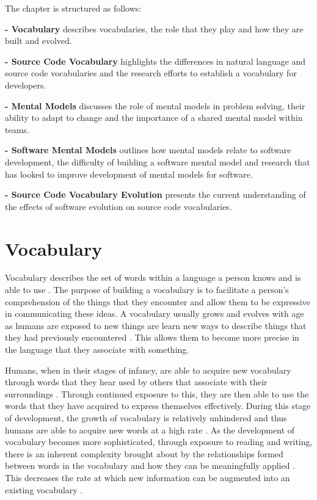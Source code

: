 The chapter is structured as follows:

\textbf{ - Vocabulary} describes vocabularies, the role that they play and how they are built and evolved.

\textbf{ - Source Code Vocabulary} highlights the differences in natural language and source code vocabularies and the research efforts to establish a vocabulary for developers.

\textbf{ - Mental Models} discusses the role of mental models in problem solving, their ability to adapt to change and the importance of a shared mental model within teams.

\textbf{ - Software Mental Models} outlines how mental models relate to software development, the difficulty of building a software mental model and research that has looked to improve development of mental models for software.

\textbf{ - Source Code Vocabulary Evolution} presents the current understanding of the effects of software evolution on source code vocabularies.

\section{Vocabulary} %
\label{sec:vocabulary}

Vocabulary describes the set of words within a language a person knows and is able to use \cite{Woodford03a}. The purpose of building a vocabulary is to facilitate a person's comprehension of the things that they encounter and allow them to be expressive in communicating these ideas. A vocabulary usually grows and evolves with age as humans are exposed to new things are learn new ways to describe things that they had previously encountered \cite{Wren00a}. This allows them to become more precise in the language that they associate with something.

Humans, when in their stages of infancy, are able to acquire new vocabulary through words that they hear used by others that associate with their surroundings \cite{Gathercole92a}. Through continued exposure to this, they are then able to use the words that they have acquired to express themselves effectively. During this stage of development, the growth of vocabulary is relatively unhindered and thus humans are able to acquire new words at a high rate \cite{Metsala98a}. As the development of vocabulary becomes more sophisticated, through exposure to reading and writing, there is an inherent complexity brought about by the relationships formed between words in the vocabulary and how they can be meaningfully applied \cite{Dickinson03a}. This decreases the rate at which new information can be augmented into an existing vocabulary \cite{Fisher94a}.


